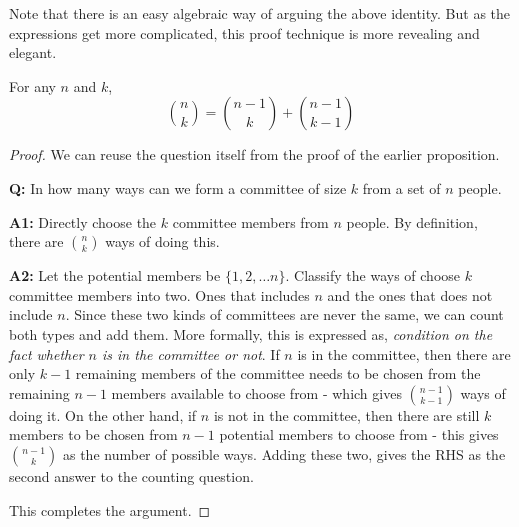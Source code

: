 Note that there is an easy algebraic way of arguing the above identity. But as the expressions get more complicated, this proof technique is more revealing and elegant.

\begin{proposition}
For any $n$ and $k$,
$${n \choose k} = {n-1 \choose k} + {n-1 \choose k-1}$$
\end{proposition}
\begin{proof}
We can reuse the question itself from the proof of the earlier proposition.
\begin{description}
\item{\bf Q:} In how many ways can we form a committee of size $k$ from a set of $n$ people.
\item{\bf A1:} Directly choose the $k$ committee members from $n$ people. By definition, there are ${n \choose k}$ ways of doing this.
\item{\bf  A2:} Let the potential members be $\{1,2, \ldots n\}$. Classify the ways of choose $k$ committee members into two. Ones that includes $n$ and the ones that does not include $n$. Since these two kinds of committees are never the same, we can count both types and add them. More formally, this is expressed as, \textit{condition on the fact whether $n$ is in the committee or not}. If $n$ is in the committee, then there are only $k-1$ remaining members of the committee needs to be chosen from the remaining $n-1$ members available to choose from - which gives ${n-1 \choose k-1}$ ways of doing it. On the other hand, if $n$ is not in the committee, then there are still $k$ members to be chosen from $n-1$ potential members to choose from - this gives ${n-1 \choose k}$ as the number of possible ways. Adding these two, gives the RHS as the second answer to the counting question.
\end{description}
This completes the argument.
\end{proof}

